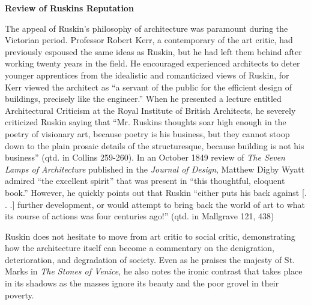 {\centering\color{black}
\textbf{Review of Ruskin{\textquotesingle}s Reputation}
\par}

{\color{black}
The appeal of Ruskin’s philosophy of architecture was paramount during
the Victorian period.  Professor Robert Kerr, a contemporary of the art
critic, had previously espoused the same ideas as Ruskin, but he had
left them behind after working twenty years in the field.  He
encouraged experienced architects to deter younger apprentices from the
idealistic and romanticized views of Ruskin, for Kerr viewed the
architect as “a servant of the public for the efficient design of
buildings, precisely like the engineer.”  When he presented a lecture
entitled {\textquotedbl}Architectural Criticism{\textquotedbl} at the
Royal Institute of British Architects, he severely criticized Ruskin
saying that “Mr. Ruskin{\textquotesingle}s thoughts soar high enough in
the poetry of visionary art, because poetry is his business, but they
cannot stoop down to the plain prosaic details of the structuresque,
because building is not his business” (qtd. in Collins 259-260).  In an
October 1849 review of \textit{The Seven Lamps of Architecture
}published in the \textit{Journal of Design}, Matthew Digby Wyatt
admired “the excellent spirit” that was present in “this thoughtful,
eloquent book.”  However, he quickly points out that Ruskin “either
puts his back against  [. . .] further development, or would attempt to
bring back the world of art to what its course of actions was four
centuries ago!”  (qtd. in Mallgrave 121, 438)}

{\color{black}
Ruskin does not hesitate to move from art critic to social critic,
demonstrating how the architecture itself can become a commentary on
the denigration, deterioration, and degradation of society.  Even as he
praises the majesty of St. Mark{\textquotesingle}s in \textit{The
Stones of Venice}, he also notes the ironic contrast that takes place
in its shadows as the masses ignore its beauty and the poor grovel in
their poverty.  }

